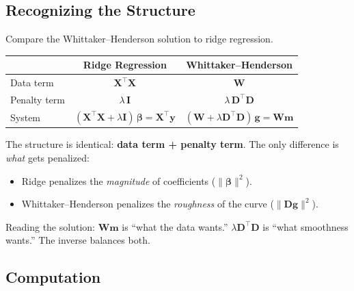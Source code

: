 \documentclass[11pt,a4paper]{article}
\begin{document}
\subsection{Recognizing the Structure}

\begin{intuition}
Compare the Whittaker--Henderson solution to ridge regression.

\medskip
\begin{center}
\renewcommand{\arraystretch}{1.35}
\begin{tabular}{lcc}
\toprule
& \textbf{Ridge Regression} & \textbf{Whittaker--Henderson} \\
\midrule
Data term     & $\bm{X}^\top\bm{X}$     & $\bm{W}$ \\
Penalty term  & $\lambda\,\bm{I}$        & $\lambda\,\bm{D}^\top\bm{D}$ \\
System        & $(\bm{X}^\top\bm{X} + \lambda\bm{I})\,\bm{\beta} = \bm{X}^\top\bm{y}$
              & $(\bm{W} + \lambda\bm{D}^\top\bm{D})\,\bm{g} = \bm{W}\bm{m}$ \\
\bottomrule
\end{tabular}
\end{center}

\medskip
The structure is identical: \textbf{data term + penalty term}.  The only difference is \emph{what} gets penalized:
\begin{itemize}[nosep]
  \item Ridge penalizes the \emph{magnitude} of coefficients ($\|\bm{\beta}\|^2$).
  \item Whittaker--Henderson penalizes the \emph{roughness} of the curve ($\|\bm{D}\bm{g}\|^2$).
\end{itemize}

Reading the solution: $\bm{W}\bm{m}$ is ``what the data wants.''  $\lambda\bm{D}^\top\bm{D}$ is ``what smoothness wants.''  The inverse balances both.
\end{intuition}

\subsection{Computation}
\end{document}
